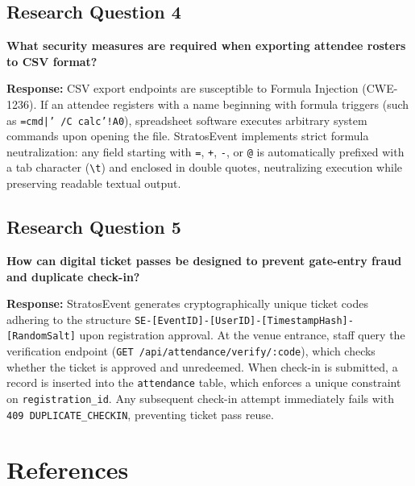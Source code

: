 \documentclass[11pt,a4paper]{article}
\begin{document}
\subsection*{Research Question 4}
\textbf{What security measures are required when exporting attendee rosters to CSV format?}

\textbf{Response:}
CSV export endpoints are susceptible to Formula Injection (CWE-1236). If an attendee registers with a name beginning with formula triggers (such as \texttt{=cmd|' /C calc'!A0}), spreadsheet software executes arbitrary system commands upon opening the file. StratosEvent implements strict formula neutralization: any field starting with \texttt{=}, \texttt{+}, \texttt{-}, or \texttt{@} is automatically prefixed with a tab character (\texttt{\textbackslash t}) and enclosed in double quotes, neutralizing execution while preserving readable textual output.

\subsection*{Research Question 5}
\textbf{How can digital ticket passes be designed to prevent gate-entry fraud and duplicate check-in?}

\textbf{Response:}
StratosEvent generates cryptographically unique ticket codes adhering to the structure \texttt{SE-[EventID]-[UserID]-[TimestampHash]-[RandomSalt]} upon registration approval. At the venue entrance, staff query the verification endpoint (\texttt{GET /api/attendance/verify/:code}), which checks whether the ticket is approved and unredeemed. When check-in is submitted, a record is inserted into the \texttt{attendance} table, which enforces a unique constraint on \texttt{registration\_id}. Any subsequent check-in attempt immediately fails with \texttt{409 DUPLICATE\_CHECKIN}, preventing ticket pass reuse.

\newpage
\section*{{\color{TitleBlue}\bfseries
\fontsize{18}{22}\selectfont References}}
\end{document}
